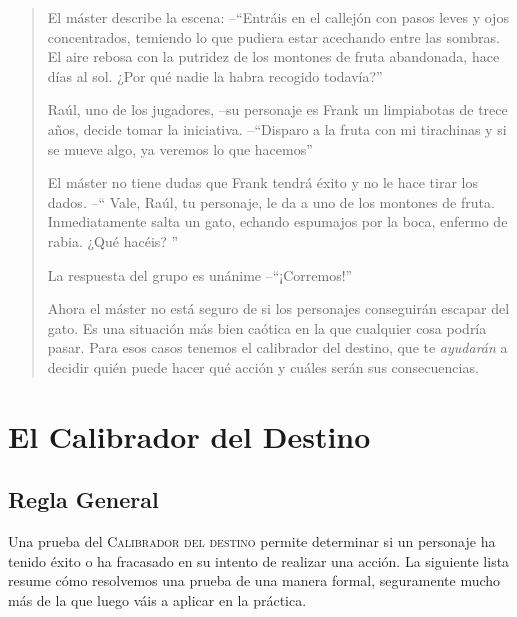 
\begin{quotation}

\noindent El máster describe la escena: --\enquote{Entráis en el callejón con pasos
 leves y ojos concentrados, temiendo lo que pudiera estar acechando entre 
 las sombras. El aire rebosa con la putridez de los montones de fruta abandonada, 
 hace días al sol. ¿Por qué nadie la habra recogido todavía?}

Raúl, uno de los jugadores, --su personaje es Frank un limpiabotas de trece años, 
decide tomar la iniciativa. --\enquote{Disparo a la fruta con mi tirachinas 
y si se mueve algo, ya veremos lo que hacemos}

El máster no tiene dudas que Frank tendrá éxito y no le hace tirar los dados. --\enquote{
Vale, Raúl, tu personaje, le da a uno de los montones de fruta. Inmediatamente
salta un gato, echando espumajos por la boca, enfermo de rabia. ¿Qué hacéis?
}

La respuesta del grupo es unánime --\enquote{¡Corremos!} 

Ahora el máster no está seguro de si los personajes conseguirán escapar del gato.
Es una situación más bien caótica en la que cualquier cosa podría pasar. Para esos
casos tenemos el calibrador del destino, que te \emph{ayudarán} a decidir quién puede 
hacer qué acción y cuáles serán sus consecuencias.

\end{quotation}

\section{El Calibrador del Destino}

\subsection{Regla General}

Una prueba del \textsc{Calibrador del destino} 
permite determinar si un personaje ha tenido éxito o ha fracasado 
en su intento de realizar una acción. La siguiente lista resume 
cómo resolvemos una prueba de una manera formal, seguramente mucho 
más de la que luego váis a aplicar en la práctica.

